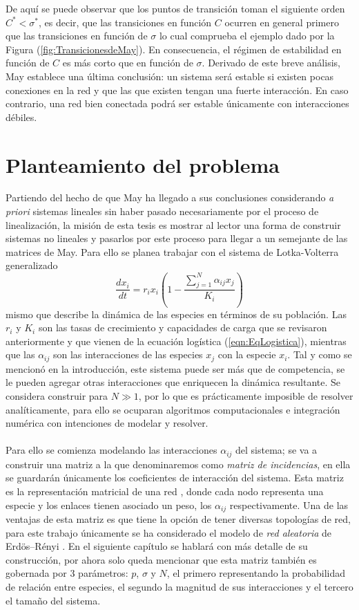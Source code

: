 De aquí se puede observar que los puntos de transición toman el siguiente orden $C^*<\sigma^*$, es decir, que las transiciones en función $C$ ocurren en general primero que las transiciones en función de $\sigma$ lo cual comprueba el ejemplo dado por la Figura (\ref{fig:TransicionesdeMay}). En consecuencia, el régimen de estabilidad en función de $C$ es más corto que en función de $\sigma$. Derivado de este breve análisis, May establece una última conclusión: un sistema será estable si existen pocas conexiones en la red y que las que existen tengan una fuerte interacción. En caso contrario, una red bien conectada podrá ser estable únicamente con interacciones débiles.
\newpage
\section{Planteamiento del problema}
Partiendo del hecho de que May ha llegado a sus conclusiones considerando \textit{a priori} sistemas lineales sin haber pasado necesariamente por el proceso de linealización, la misión de esta tesis es mostrar al lector una forma de construir sistemas no lineales y pasarlos por este proceso para llegar a un semejante de las matrices de May. Para ello se planea trabajar con el sistema de Lotka-Volterra generalizado \cite{may2007theoretical}
$$\frac{dx_i}{dt}=r_ix_i\left(1-\frac{\sum_{j=1}^N \alpha_{ij}x_j}{K_i}\right)$$
mismo que describe la dinámica de las especies en términos de su población. Las $r_i$ y $K_i$ son las tasas de crecimiento y capacidades de carga que se revisaron anteriormente y que vienen de la ecuación logística (\ref{eqn:EqLogistica}), mientras que las $\alpha_{ij}$ son las interacciones de las especies $x_j$ con la especie $x_i$. Tal y como se mencionó en la introducción, este sistema puede ser más que de competencia, se le pueden agregar otras interacciones que enriquecen la dinámica resultante. Se considera construir para $N\gg 1$, por lo que es prácticamente imposible de resolver analíticamente, para ello se ocuparan algoritmos computacionales e integración numérica con intenciones de modelar y resolver. \\
\\
Para ello se comienza modelando las interacciones $\alpha_{ij}$ del sistema; se va a construir una matriz a la que denominaremos como \textit{matriz de incidencias}, en ella se guardarán únicamente los coeficientes de interacción del sistema. Esta matriz es la representación matricial de una red \cite{newman2018networks}, donde cada nodo representa una especie y los enlaces tienen asociado un peso, los $\alpha_{ij}$ respectivamente. Una de las ventajas de esta matriz es que tiene la opción de tener diversas topologías de red, para este trabajo únicamente se ha considerado el modelo de \textit{red aleatoria} de Erdös–Rényi \cite{posfai2016network}. En el siguiente capítulo se hablará con más detalle de su construcción, por ahora solo queda mencionar que esta matriz también es gobernada por 3 parámetros: $p$, $\sigma$ y $N$, el primero representando la probabilidad de relación entre especies, el segundo la magnitud de sus interacciones y el tercero el tamaño del sistema. \\

